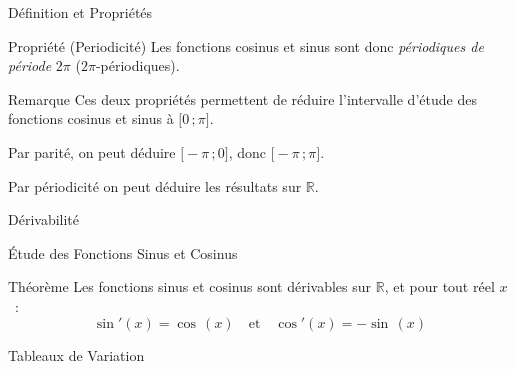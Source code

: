 \documentclass{coursbook}
\begin{document}
\begin{Gpartie}{Définition et Propriétés}
\begin{Spartie}{Propriété (Periodicité)}
            Les fonctions cosinus et sinus sont donc \emph{périodiques de période} $2\pi$ ($2\pi$-périodiques).
        \end{Spartie}
        \begin{Spartie}{Remarque} 
            Ces deux propriétés permettent de réduire l'intervalle d'étude des fonctions cosinus et sinus à $\big[0\,; \pi\big]$.

            Par parité, on peut déduire $\big[-\pi\,; 0\big]$, donc $\big[-\pi\,; \pi\big]$.
            
            Par périodicité on peut déduire les résultats sur $\mathbb{R}$.
        \end{Spartie}
    \end{Gpartie}
    \vfill
    \begin{Gpartie}{Dérivabilité} 
        \begin{Spartie}{Étude des Fonctions Sinus et Cosinus} 
            \begin{SSpartie}{Théorème} 
                Les fonctions sinus et cosinus sont dérivables sur $\mathbb{R}$, et pour tout réel $x$~: \[\boxed{\sin'(x)=\cos\,(x)}\quad\text{et}\quad\boxed{\cos'(x)=-\sin\,(x)}\]
            \end{SSpartie}
            \begin{SSpartie}{Tableaux de Variation} 
                \begin{center}
                    \parbox{\linewidth}{}
                \end{center}
            \end{SSpartie} \pagebreak

\end{Spartie}
\end{Gpartie}
\end{document}
